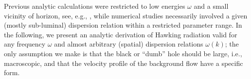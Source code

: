 \documentclass[12pt,aps,prl,showpacs,amssymb,nofootinbib,onecolumn]{revtex4-2}
\begin{document}

Previous analytic calculations were restricted to low energies
$\omega$ and a small vicinity of horizon, see, e.g.,
\cite{universality}, while numerical studies necessarily involved 
a given (mostly sub-luminal) dispersion relation within a restricted
parameter range. 
%
In the following, we present an analytic derivation of Hawking
radiation valid for any frequency $\omega$ and almost arbitrary
(spatial) dispersion relations $\omega(k)$; the only assumption we
make is that the black or ``dumb'' hole should be large, i.e.,
macroscopic, and that the velocity profile of the background flow have 
a specific form.  

\end{document}
